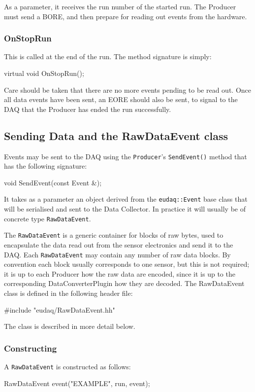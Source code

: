 As a parameter, it receives the run number of the started run.
The Producer must send a \gls{BORE},
and then prepare for reading out events from the hardware.

\subsubsection{OnStopRun}
This is called at the end of the run.
The method signature is simply:
\begin{listing}
virtual void OnStopRun();
\end{listing}

Care should be taken that there are no more events pending to be read out.
Once all data events have been sent, an \gls{EORE} should also be sent,
to signal to the DAQ that the Producer has ended the run successfully.

\subsection{Sending Data and the RawDataEvent class}
Events may be sent to the DAQ using the \texttt{Producer}'s \texttt{SendEvent()} method
that has the following signature:
\begin{listing}
void SendEvent(const Event &);
\end{listing}

It takes as a parameter an object derived from the \texttt{eudaq::Event} base class
that will be serialised and sent to the Data Collector.
In practice it will usually be of concrete type \texttt{RawDataEvent}.

The \texttt{RawDataEvent} is a generic container for blocks of raw bytes,
used to encapsulate the data read out from the sensor electronics
and send it to the DAQ.
Each \texttt{RawDataEvent} may contain any number of raw data blocks.
By convention each block usually corresponds to one sensor,
but this is not required;
it is up to each Producer how the raw data are encoded,
since it is up to the corresponding DataConverterPlugin how they are decoded.
The RawDataEvent class is defined in the following header file:
\begin{listing}
#include "eudaq/RawDataEvent.hh"
\end{listing}

The class is described in more detail below.

\subsubsection{Constructing}
A \texttt{RawDataEvent} is constructed as follows:
\begin{listing}
RawDataEvent event("EXAMPLE", run, event);
\end{listing}

